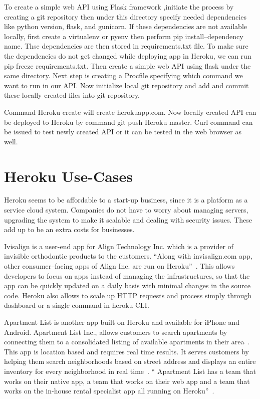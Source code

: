 To create a simple web API using Flask framework ,initiate the process
 by creating a git repository then under this directory specify needed
 dependencies like python version, flask, and gunicorn. If these
 dependencies are not available locally, first create a virtualenv or
 pyenv then perform pip install--dependency name. Thse dependencies are
 then stored in requirements.txt file. To make sure the dependencies do
 not get changed while deploying app in Heroku, we can run pip freeze
 requirements.txt. Then create a simple web API using flask under the same
 directory. Next step is creating a Procfile specifying which command we
 want to run in our API. Now initialize local git repository and  add and
 commit these locally created files into git repository.

Command Heroku create will create herokuapp.com. Now locally created API
 can be deployed to Heroku by command git push Heroku master. Curl command
 can be issued to test newly created API or it can be tested in the web
 browser as well.


\section{Heroku Use-Cases}
Heroku seems to be affordable to a start-up business, since it is a platform
 as a service cloud system. Companies do not have to worry about managing
 servers, upgrading the system to make it scalable and dealing with security
 issues. These add up to be an extra costs for businesses. 

Ivisalign is a user-end app for Align Technology Inc. which is a provider of
 invisible orthodontic products to the customers. ``Along with invisalign.com app,
 other consumer--facing apps of Align Inc. are run on
 Heroku''~\cite{www-customers-heroku-com}. This allows developers to focus
 on apps instead of managing the infrastructures, so that the app can be quickly
 updated on a daily basis with minimal changes in the source code. Heroku also
 allows to scale up HTTP requests and process simply through dashboard or a
 single command in heroku CLI. 

 Apartment List is another app built on Heroku and available for iPhone and
 Android. Apartment List Inc., allows customers to search apartments by
 connecting them to a consolidated listing of available apartments in
 their area~\cite{www-customers-heroku-com}. This app is location based
 and requires real time results. It serves customers by helping them search
 neighborhoods based on street address and displays an entire inventory for
 every neighborhood in real time~\cite{www-customers-heroku-com}.
 `` Apartment List has a team that works on their native app, a team
 that works on their web app and a team that works on the in-house rental
 specialist app  all running on Heroku''~\cite{www-customers-heroku-com}.

